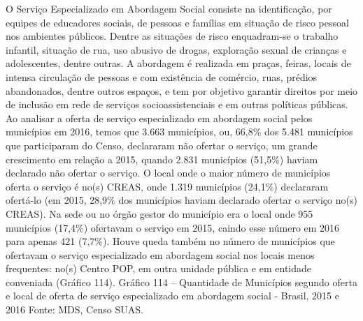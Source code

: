 \documentclass[
  brazilian]{report}
\begin{document}
O Serviço Especializado em Abordagem Social consiste na identificação,
por equipes de educadores sociais, de pessoas e famílias em situação de
risco pessoal nos ambientes públicos. Dentre as situações de risco
enquadram-se o trabalho infantil, situação de rua, uso abusivo de
drogas, exploração sexual de crianças e adolescentes, dentre outras. A
abordagem é realizada em praças, feiras, locais de intensa circulação de
pessoas e com existência de comércio, ruas, prédios abandonados, dentre
outros espaços, e tem por objetivo garantir direitos por meio de
inclusão em rede de serviços socioassistenciais e em outras políticas
públicas. Ao analisar a oferta de serviço especializado em abordagem
social pelos municípios em 2016, temos que 3.663 municípios, ou, 66,8\%
dos 5.481 municípios que participaram do Censo, declararam não ofertar o
serviço, um grande crescimento em relação a 2015, quando 2.831
municípios (51,5\%) haviam declarado não ofertar o serviço. O local onde
o maior número de municípios oferta o serviço é no(s) CREAS, onde 1.319
municípios (24,1\%) declararam ofertá-lo (em 2015, 28,9\% dos municípios
haviam declarado ofertar o serviço no(s) CREAS). Na sede ou no órgão
gestor do município era o local onde 955 municípios (17,4\%) ofertavam o
serviço em 2015, caindo esse número em 2016 para apenas 421 (7,7\%).
Houve queda também no número de municípios que ofertavam o serviço
especializado em abordagem social nos locais menos frequentes: no(s)
Centro POP, em outra unidade pública e em entidade conveniada (Gráfico
114). Gráfico 114 -- Quantidade de Municípios segundo oferta e local de
oferta de serviço especializado em abordagem social - Brasil, 2015 e
2016 Fonte: MDS, Censo SUAS.
\end{document}
